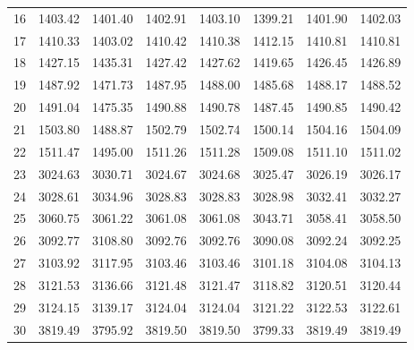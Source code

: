 \documentclass[10pt,oneside]{article}
\begin{document}
\begin{table}[h!]
\begin{tabular}{cccccccc}
16 &   1403.42 & 1401.40 & 1402.91 & 1403.10 &      1399.21 & 1401.90 & 1402.03 \\
17 &   1410.33 & 1403.02 & 1410.42 & 1410.38 &      1412.15 & 1410.81 & 1410.81 \\
18 &   1427.15 & 1435.31 & 1427.42 & 1427.62 &      1419.65 & 1426.45 & 1426.89 \\
19 &   1487.92 & 1471.73 & 1487.95 & 1488.00 &      1485.68 & 1488.17 & 1488.52 \\
20 &   1491.04 & 1475.35 & 1490.88 & 1490.78 &      1487.45 & 1490.85 & 1490.42 \\
21 &   1503.80 & 1488.87 & 1502.79 & 1502.74 &      1500.14 & 1504.16 & 1504.09 \\
22 &   1511.47 & 1495.00 & 1511.26 & 1511.28 &      1509.08 & 1511.10 & 1511.02 \\
23 &   3024.63 & 3030.71 & 3024.67 & 3024.68 &      3025.47 & 3026.19 & 3026.17 \\
24 &   3028.61 & 3034.96 & 3028.83 & 3028.83 &      3028.98 & 3032.41 & 3032.27 \\
25 &   3060.75 & 3061.22 & 3061.08 & 3061.08 &      3043.71 & 3058.41 & 3058.50 \\
26 &   3092.77 & 3108.80 & 3092.76 & 3092.76 &      3090.08 & 3092.24 & 3092.25 \\
27 &   3103.92 & 3117.95 & 3103.46 & 3103.46 &      3101.18 & 3104.08 & 3104.13 \\
28 &   3121.53 & 3136.66 & 3121.48 & 3121.47 &      3118.82 & 3120.51 & 3120.44 \\
29 &   3124.15 & 3139.17 & 3124.04 & 3124.04 &      3121.22 & 3122.53 & 3122.61 \\
30 &   3819.49 & 3795.92 & 3819.50 & 3819.50 &      3799.33 & 3819.49 & 3819.49 \\
\bottomrule
\end{tabular}
\end{table}

\clearpage
\end{document}
